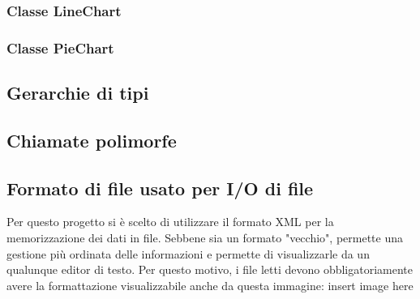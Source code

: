 \documentclass[10pt]{article}
\begin{document}
    \subsubsection{Classe LineChart}
    \subsubsection{Classe PieChart}
    \subsection{Gerarchie di tipi}
    \subsection{Chiamate polimorfe}
    \subsection{Formato di file usato per I/O di file}
    Per questo progetto si è scelto di utilizzare il formato XML per la memorizzazione dei dati in file. Sebbene sia un formato "vecchio", permette una gestione più ordinata delle informazioni e permette di visualizzarle da un qualunque editor di testo.
    Per questo motivo, i file letti devono obbligatoriamente avere la formattazione visualizzabile anche da questa immagine: insert image here
	
\end{document}
